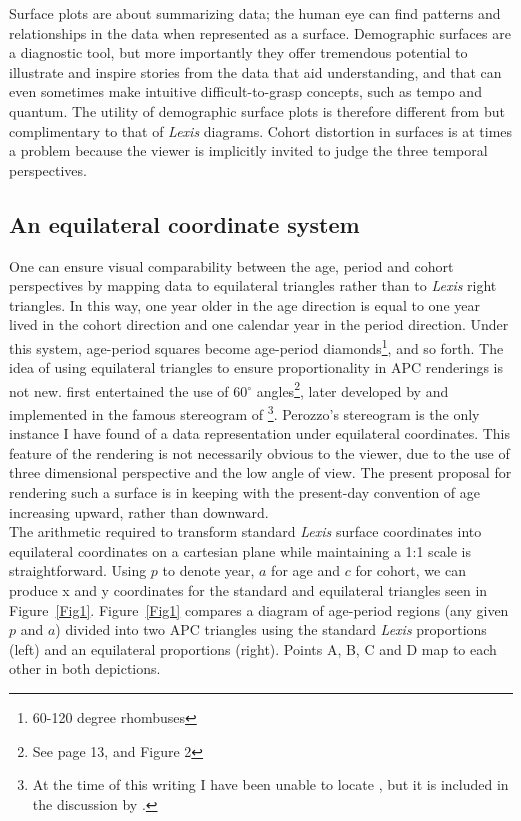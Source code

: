 \documentclass[a4paper]{article}
\begin{document}
Surface plots are about summarizing data; the human eye can find patterns and relationships in the data when represented as a surface. Demographic surfaces are a diagnostic tool, but more importantly they offer tremendous potential to illustrate and inspire stories from the data that aid understanding, and that can even sometimes make intuitive difficult-to-grasp concepts, such as tempo and quantum. The utility of demographic surface plots is therefore different from but complimentary to that of \textit{Lexis} diagrams. Cohort distortion in surfaces is at times a problem because the viewer is implicitly invited to judge the three temporal perspectives.

\subsection*{An equilateral coordinate system}
One can ensure visual comparability between the age, period and cohort perspectives by mapping data to equilateral triangles rather than to \textit{Lexis} right triangles. In this way, one year older in the age direction is equal to one year lived in the cohort direction and one calendar year in the period direction. Under this system, age-period squares become age-period diamonds\footnote{60-120 degree rhombuses}, and so forth. The idea of using equilateral triangles to ensure proportionality in APC renderings is not new. \citet{lexis1875einleitung} first entertained the use of 60$^\circ$ angles\footnote{See \citet{lexis1875einleitung} page 13, and Figure 2}, later developed by \citet{lewin1876rapport} and implemented in the famous stereogram of \citet{perozzo1880della}\footnote{At the time of this writing I have been unable to locate \citet{lewin1876rapport}, but it is included in the discussion by \citet{keiding2011age}.}. Perozzo's stereogram is the only instance I have found of a data representation under equilateral coordinates. This feature of the rendering is not necessarily obvious to the viewer, due to the use of three dimensional perspective and the low angle of view. The present proposal for rendering such a surface is in keeping with the present-day convention of age increasing upward, rather than downward.\\

The arithmetic required to transform standard \textit{Lexis} surface coordinates into equilateral coordinates on a cartesian plane while maintaining a 1:1 scale is straightforward. Using $p$ to denote year, $a$ for age and $c$ for cohort, we can produce x and y coordinates for the standard and equilateral triangles seen in Figure~\ref{Fig1}. Figure~\ref{Fig1} compares a diagram of age-period regions (any given $p$ and $a$) divided into two APC triangles using the standard \textit{Lexis} proportions (left) and an equilateral proportions (right). Points A, B, C and D map to each other in both depictions.\\
\end{document}
